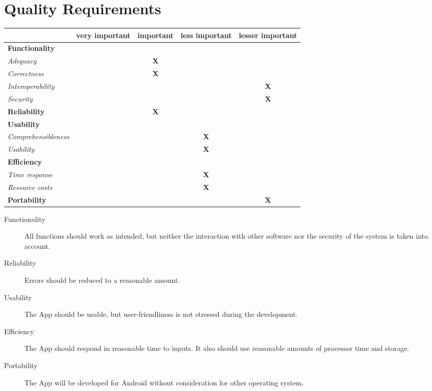 \section{Quality Requirements}


\begin{center}
 \begin{tabular}{lcccc}
  \hline
   & very important & important & less important & lesser important \\
  \hline 
  \multicolumn{5}{l}{\textbf{Functionality}} \\
  
  \quad\textit{Adequacy}&&\textbf{X}&&\\
  \quad\textit{Correctness}&&\textbf{X}&&\\
  \quad\textit{Interoperability}&&&& \textbf{X}\\
  \quad\textit{Security}&&&&\textbf{X}\\
 
  \hline
  \textbf{Reliability}&&\textbf{X}&&\\
 
  \hline
  \multicolumn{5}{l}{\textbf{Usability}}\\
  \quad\textit{Comprehensibleness}&&&\textbf{X}&\\
  \quad\textit{Usability}&&&\textbf{X}&\\
  \hline
  \multicolumn{5}{l}{\textbf{Efficiency}}\\
  \quad\textit{Time response}&&&\textbf{X}&\\
  \quad\textit{Resource costs}&&&\textbf{X}&\\
  \hline
  \textbf{Portability}&&&&\textbf{X}\\
  \hline
  \end{tabular}
\end{center}

\bigskip

\begin{description}
	\item[Functionality] All functions should work as intended, but neither the interaction with other software nor the security of the system is taken into account.
	
	\item[Reliability] Errors should be reduced to a reasonable amount.
	
	\item[Usability] The App should be usable, but user-friendliness is not stressed during the development.
	
	\item[Efficiency] The App should respond in reasonable time to inputs. It also should use reasonable amounts of processor time and storage.
	
	\item[Portability] The App will be developed for Android without consideration for other operating system. 
\end{description}

